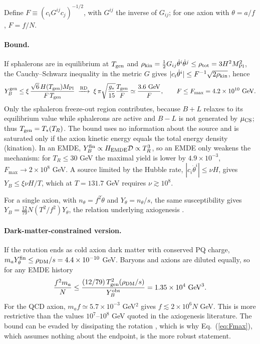 \documentclass[11pt]{article}
\newcommand{\Mpl}{M_{\rm Pl}}
\begin{document}
Define $F\equiv(c_iG^{ij}c_j)^{-1/2}$, with $G^{ij}$ the inverse of $G_{ij}$; for one axion with $\theta=a/f$, $F=f/N$.

\paragraph*{Bound.} If sphalerons are in equilibrium at $T_{\rm gen}$ and $\rho_{\rm kin}=\tfrac12G_{ij}\dot\theta^i\dot\theta^j\le\rho_{\rm tot}=3H^2\Mpl^2$, the Cauchy--Schwarz inequality in the metric $G$ gives $|c_i\dot\theta^i|\le F^{-1}\sqrt{2\rho_{\rm kin}}$, hence
\begin{equation}
Y_B^{\rm gen}\le\xi\,\frac{\sqrt6\,H(T_{\rm gen})\Mpl}{F\,T_{\rm gen}}
\;\xrightarrow{\rm RD}\;\xi\,\pi\sqrt{\frac{g_*}{15}}\frac{T_{\rm gen}}{F}\simeq\frac{3.6\ {\rm GeV}}{F},\qquad
F\le F_{\max}=4.2\times10^{10}\ {\rm GeV}.
\label{eq:Fmax}
\end{equation}
Only the sphaleron freeze-out region contributes, because $B+L$ relaxes to its equilibrium value while sphalerons are active and $B-L$ is not generated by $\mu_{\rm CS}$; thus $T_{\rm gen}=T_*(T_R)$. The bound uses no information about the source and is saturated only if the axion kinetic energy equals the total energy density (kination). In an EMDE, $Y_B^{\rm fin}\propto H_{\rm EMDE}\mathcal D\propto T_R^{3}$, so an EMDE only weakens the mechanism: for $T_R\le30$ GeV the maximal yield is lower by $4.9\times10^{-3}$, $F_{\max}\to2\times10^8$ GeV. A source limited by the Hubble rate, $|c_i\dot\theta^i|\le\nu H$, gives $Y_B\le\xi\nu H/T$, which at $T=131.7$ GeV requires $\nu\gtrsim10^8$.

For a single axion, with $n_\theta=f^2\dot\theta$ and $Y_\theta=n_\theta/s$, the same susceptibility gives $Y_B=\tfrac{12}{79}N(T^2/f^2)Y_\theta$, the relation underlying axiogenesis \cite{CoHarigaya}.

\paragraph*{Dark-matter-constrained version.} If the rotation ends as cold axion dark matter with conserved PQ charge, $m_aY_\theta^{\rm fin}\le\rho_{\rm DM}/s=4.4\times10^{-10}$ GeV. Baryons and axions are diluted equally, so for any EMDE history
\begin{equation}
\frac{f^2m_a}{N}\le\frac{(12/79)\,T_{\rm gen}^2(\rho_{\rm DM}/s)}{Y_B^{\rm obs}}=1.35\times10^4\ {\rm GeV}^3.
\end{equation}
For the QCD axion, $m_af\simeq5.7\times10^{-3}$ GeV$^2$ gives $f\lesssim2\times10^6N$ GeV. This is more restrictive than the values $10^7$--$10^8$ GeV quoted in the axiogenesis literature. The bound can be evaded by dissipating the rotation \cite{Asadi}, which is why Eq.~(\ref{eq:Fmax}), which assumes nothing about the endpoint, is the more robust statement.
\end{document}

